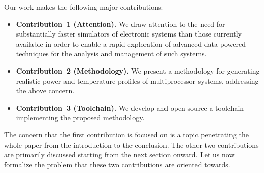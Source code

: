 Our work makes the following major contributions:

\begin{itemize}
  \item {\bfseries Contribution~1 (Attention).} We draw attention to the need
  for substantially faster simulators of electronic systems than those currently
  available in order to enable a rapid exploration of advanced data-powered
  techniques for the analysis and management of such systems.

  \item {\bfseries Contribution~2 (Methodology).} We present a methodology for
  generating realistic power and temperature profiles of multiprocessor systems,
  addressing the above concern.

  \item {\bfseries Contribution~3 (Toolchain).} We develop and open-source a
  toolchain implementing the proposed methodology.
\end{itemize}

The concern that the first contribution is focused on is a topic penetrating the
whole paper from the introduction to the conclusion. The other two contributions
are primarily discussed starting from the next section onward. Let us now
formalize the problem that these two contributions are oriented towards.
